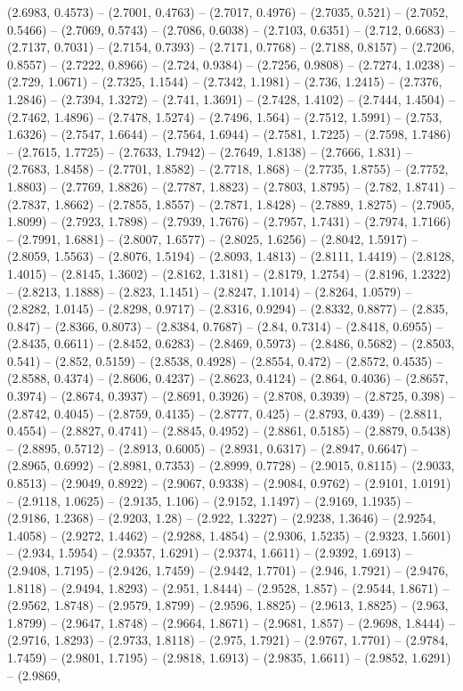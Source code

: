 (2.6983, 0.4573) -- (2.7001, 0.4763) -- (2.7017, 0.4976) -- (2.7035, 0.521) -- (2.7052, 0.5466) -- (2.7069, 0.5743) -- (2.7086, 0.6038) -- (2.7103, 0.6351) -- (2.712, 0.6683) -- (2.7137, 0.7031) -- (2.7154, 0.7393) -- (2.7171, 0.7768) -- (2.7188, 0.8157) -- (2.7206, 0.8557) -- (2.7222, 0.8966) -- (2.724, 0.9384) -- (2.7256, 0.9808) -- (2.7274, 1.0238) -- (2.729, 1.0671) -- (2.7325, 1.1544) -- (2.7342, 1.1981) -- (2.736, 1.2415) -- (2.7376, 1.2846) -- (2.7394, 1.3272) -- (2.741, 1.3691) -- (2.7428, 1.4102) -- (2.7444, 1.4504) -- (2.7462, 1.4896) -- (2.7478, 1.5274) -- (2.7496, 1.564) -- (2.7512, 1.5991) -- (2.753, 1.6326) -- (2.7547, 1.6644) -- (2.7564, 1.6944) -- (2.7581, 1.7225) -- (2.7598, 1.7486) -- (2.7615, 1.7725) -- (2.7633, 1.7942) -- (2.7649, 1.8138) -- (2.7666, 1.831) -- (2.7683, 1.8458) -- (2.7701, 1.8582) -- (2.7718, 1.868) -- (2.7735, 1.8755) -- (2.7752, 1.8803) -- (2.7769, 1.8826) -- (2.7787, 1.8823) -- (2.7803, 1.8795) -- (2.782, 1.8741) -- (2.7837, 1.8662) -- (2.7855, 1.8557) -- (2.7871, 1.8428) -- (2.7889, 1.8275) -- (2.7905, 1.8099) -- (2.7923, 1.7898) -- (2.7939, 1.7676) -- (2.7957, 1.7431) -- (2.7974, 1.7166) -- (2.7991, 1.6881) -- (2.8007, 1.6577) -- (2.8025, 1.6256) -- (2.8042, 1.5917) -- (2.8059, 1.5563) -- (2.8076, 1.5194) -- (2.8093, 1.4813) -- (2.8111, 1.4419) -- (2.8128, 1.4015) -- (2.8145, 1.3602) -- (2.8162, 1.3181) -- (2.8179, 1.2754) -- (2.8196, 1.2322) -- (2.8213, 1.1888) -- (2.823, 1.1451) -- (2.8247, 1.1014) -- (2.8264, 1.0579) -- (2.8282, 1.0145) -- (2.8298, 0.9717) -- (2.8316, 0.9294) -- (2.8332, 0.8877) -- (2.835, 0.847) -- (2.8366, 0.8073) -- (2.8384, 0.7687) -- (2.84, 0.7314) -- (2.8418, 0.6955) -- (2.8435, 0.6611) -- (2.8452, 0.6283) -- (2.8469, 0.5973) -- (2.8486, 0.5682) -- (2.8503, 0.541) -- (2.852, 0.5159) -- (2.8538, 0.4928) -- (2.8554, 0.472) -- (2.8572, 0.4535) -- (2.8588, 0.4374) -- (2.8606, 0.4237) -- (2.8623, 0.4124) -- (2.864, 0.4036) -- (2.8657, 0.3974) -- (2.8674, 0.3937) -- (2.8691, 0.3926) -- (2.8708, 0.3939) -- (2.8725, 0.398) -- (2.8742, 0.4045) -- (2.8759, 0.4135) -- (2.8777, 0.425) -- (2.8793, 0.439) -- (2.8811, 0.4554) -- (2.8827, 0.4741) -- (2.8845, 0.4952) -- (2.8861, 0.5185) -- (2.8879, 0.5438) -- (2.8895, 0.5712) -- (2.8913, 0.6005) -- (2.8931, 0.6317) -- (2.8947, 0.6647) -- (2.8965, 0.6992) -- (2.8981, 0.7353) -- (2.8999, 0.7728) -- (2.9015, 0.8115) -- (2.9033, 0.8513) -- (2.9049, 0.8922) -- (2.9067, 0.9338) -- (2.9084, 0.9762) -- (2.9101, 1.0191) -- (2.9118, 1.0625) -- (2.9135, 1.106) -- (2.9152, 1.1497) -- (2.9169, 1.1935) -- (2.9186, 1.2368) -- (2.9203, 1.28) -- (2.922, 1.3227) -- (2.9238, 1.3646) -- (2.9254, 1.4058) -- (2.9272, 1.4462) -- (2.9288, 1.4854) -- (2.9306, 1.5235) -- (2.9323, 1.5601) -- (2.934, 1.5954) -- (2.9357, 1.6291) -- (2.9374, 1.6611) -- (2.9392, 1.6913) -- (2.9408, 1.7195) -- (2.9426, 1.7459) -- (2.9442, 1.7701) -- (2.946, 1.7921) -- (2.9476, 1.8118) -- (2.9494, 1.8293) -- (2.951, 1.8444) -- (2.9528, 1.857) -- (2.9544, 1.8671) -- (2.9562, 1.8748) -- (2.9579, 1.8799) -- (2.9596, 1.8825) -- (2.9613, 1.8825) -- (2.963, 1.8799) -- (2.9647, 1.8748) -- (2.9664, 1.8671) -- (2.9681, 1.857) -- (2.9698, 1.8444) -- (2.9716, 1.8293) -- (2.9733, 1.8118) -- (2.975, 1.7921) -- (2.9767, 1.7701) -- (2.9784, 1.7459) -- (2.9801, 1.7195) -- (2.9818, 1.6913) -- (2.9835, 1.6611) -- (2.9852, 1.6291) -- (2.9869, 